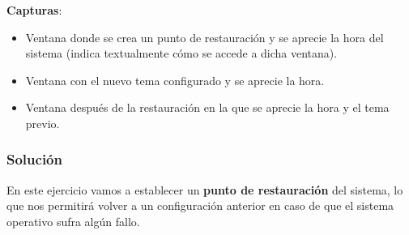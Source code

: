 \textbf{Capturas}:

\begin{itemize}
    \item Ventana donde se crea un punto de restauración y se aprecie la hora del sistema (indica textualmente cómo se accede a dicha ventana).
    \item Ventana con el nuevo tema configurado y se aprecie la hora.
    \item Ventana después de la restauración en la que se aprecie la hora y el tema previo.
\end{itemize}

\subsubsection{Solución}
En este ejercicio vamos a establecer un \textbf{punto de restauración} del sistema, lo que nos permitirá volver a un configuración anterior en caso de que el sistema operativo sufra algún fallo.

